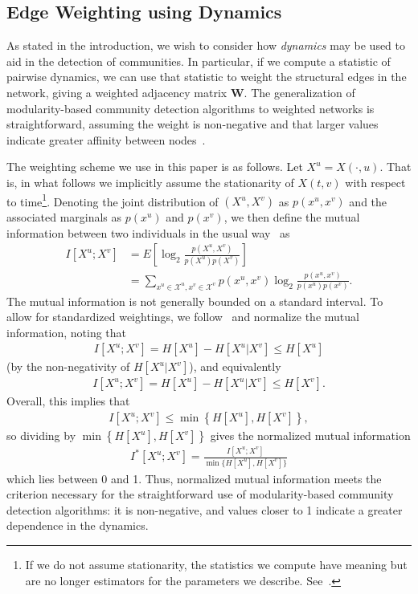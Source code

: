 \documentclass[12pt]{article}
\begin{document}
\subsection{Edge Weighting using Dynamics}

As stated in the introduction, we wish to consider how \emph{dynamics} may be used to aid in the detection of communities. In particular, if we compute a statistic of pairwise dynamics, we can use that statistic to weight the structural edges  in the network, giving a weighted adjacency matrix $\mathbf{W}.$ The generalization of modularity-based community detection algorithms to weighted networks is straightforward, assuming the weight is non-negative and that larger values indicate greater affinity between nodes~\cite{newman2004analysis}.

The weighting scheme we use in this paper is as follows. Let $X^{u} = X(\cdot, u).$ That is, in what follows we implicitly assume the stationarity of $X(t, v)$ with respect to time\footnote{If we do not assume stationarity, the statistics we compute have meaning but are no longer estimators for the parameters we describe. See~\cite{vu2009information}.}. Denoting the joint distribution of $(X^{u}, X^{v})$ as $p(x^{u}, x^{v})$ and the associated marginals as $p(x^{u})$ and $p(x^{v})$, we then define the mutual information between two individuals in the usual way~\cite{cover2012elements} as
\begin{align}
	I[X^{u}; X^{v}] &= E\left[\log_{2} \frac{p(X^{u}, X^{v})}{p(X^{u})p(X^{v})}\right]\\
	&= \sum_{x^{u} \in \mathcal{X}^{u}, x^{v} \in \mathcal{X}^{v}} p(x^{u}, x^{v}) \log_{2} \frac{p(x^{u}, x^{v})}{p(x^{u}) p(x^{v})}.
\end{align}
The mutual information is not generally bounded on a standard interval. To allow for standardized weightings, we follow~\cite{shalizi2007discovering} and normalize the mutual information, noting that
\begin{align}
	I[X^{u}; X^{v}] = H[X^{u}] - H[X^{u} | X^{v}] \leq H[X^{u}]
\end{align}
(by the non-negativity of $H[X^{u} | X^{v}]$), and equivalently
\begin{align}
	I[X^{u}; X^{v}] = H[X^{u}] - H[X^{u} | X^{v}] \leq H[X^{v}].
\end{align}
Overall, this implies that
\begin{align}
	I[X^{u}; X^{v}] \leq \min \left\{ H[X^{u}], H[X^{v}]\right\},
\end{align}
so dividing by $\min \left\{ H[X^{u}], H[X^{v}]\right\}$ gives the normalized mutual information
\begin{align}
	I^{*}[X^{u}; X^{v}] = \frac{I[X^{u}; X^{v}]}{\min \{ H[X^{u}], H[X^{v}]\}} \label{normalized-MI}
\end{align}
which lies between 0 and 1. Thus, normalized mutual information meets the criterion necessary for the straightforward use of modularity-based community detection algorithms: it is non-negative, and values closer to 1 indicate a greater dependence in the dynamics.
\end{document}
